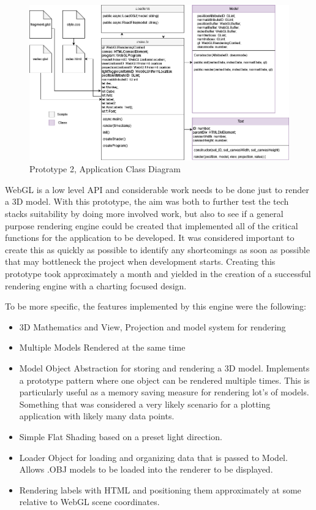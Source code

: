 \begin{figure}
    \centering
    \includegraphics[width=1\columnwidth]{author-files/figures/UML_Prototype2fin.png}
    \caption{Prototype 2, Application Class Diagram}
    \label{fig:proto2class}
\end{figure}

\hfill

WebGL is a low level API and considerable work needs to be done just to render a 3D model. With this prototype, the aim was both to further test the tech stacks suitability by doing more involved work, but also to see if a general purpose rendering engine could be created that implemented all of the critical functions for the application to be developed. It was considered important to create this as quickly as possible to identify any shortcomings as soon as possible that may bottleneck the project when development starts. Creating this prototype took approximately a month and yielded in the creation of a successful rendering engine with a charting focused design.

To be more specific, the features implemented by this engine were the following:
\begin{itemize}
    \item 3D Mathematics and View, Projection and model system for rendering
    \item Multiple Models Rendered at the same time
    \item Model Object Abstraction for storing and rendering a 3D model. Implements a prototype pattern where one object can be rendered multiple times. This is particularly useful as a memory saving measure for rendering lot's of models. Something that was considered a very likely scenario for a plotting application with likely many data points.
    \item Simple Flat Shading based on a preset light direction.
    \item Loader Object for loading and organizing data that is passed to Model. Allows .OBJ models to be loaded into the renderer to be displayed.
    \item Rendering labels with HTML and positioning them approximately at some relative to WebGL scene coordinates.
\end{itemize}

